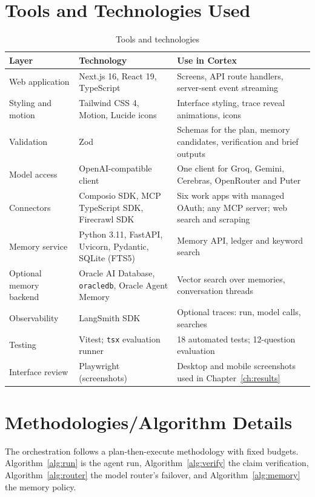 \documentclass[oneside,a4paper,12pt]{report}
\begin{document}
  \section{Tools and Technologies Used}
\begin{table}[!htbp]
\begin{center}
\def\arraystretch{1.25}
\small
\begin{tabularx}{\textwidth}{| p{3.4cm} | p{4.2cm} | X |}
\hline
Layer & Technology & Use in Cortex \\ \hline
Web application & Next.js 16, React 19, TypeScript & Screens, API route handlers, server-sent event streaming \\ \hline
Styling and motion & Tailwind CSS 4, Motion, Lucide icons & Interface styling, trace reveal animations, icons \\ \hline
Validation & Zod & Schemas for the plan, memory candidates, verification and brief outputs \\ \hline
Model access & OpenAI-compatible client & One client for Groq, Gemini, Cerebras, OpenRouter and Puter \\ \hline
Connectors & Composio SDK, MCP TypeScript SDK, Firecrawl SDK & Six work apps with managed OAuth; any MCP server; web search and scraping \\ \hline
Memory service & Python 3.11, FastAPI, Uvicorn, Pydantic, SQLite (FTS5) & Memory API, ledger and keyword search \\ \hline
Optional memory backend & Oracle AI Database, \texttt{oracledb}, Oracle Agent Memory & Vector search over memories, conversation threads \\ \hline
Observability & LangSmith SDK & Optional traces: run, model calls, searches \\ \hline
Testing & Vitest; \texttt{tsx} evaluation runner & 18 automated tests; 12-question evaluation \\ \hline
Interface review & Playwright (screenshots) & Desktop and mobile screenshots used in Chapter~\ref{ch:results} \\ \hline
\end{tabularx}
\end{center}
\caption{Tools and technologies}
\label{tab:tools}
\end{table}

  \section{Methodologies/Algorithm Details}
The orchestration follows a plan-then-execute methodology with fixed budgets. Algorithm~\ref{alg:run} is the agent run, Algorithm~\ref{alg:verify} the claim verification, Algorithm~\ref{alg:router} the model router's failover, and Algorithm~\ref{alg:memory} the memory policy.
\end{document}
